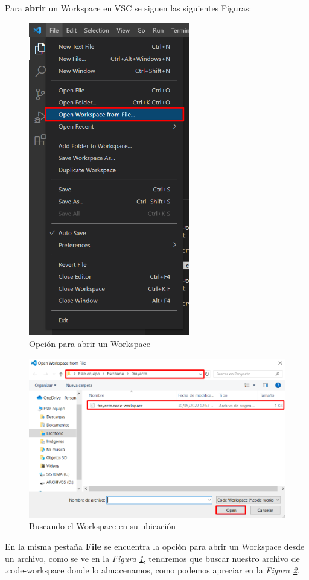 Para \textbf{abrir} un Workspace en VSC se siguen las siguientes Figuras:
\begin{figure}[H]
    \centering
    \caption{Opción para abrir un Workspace}
    \label{fig: 9}
    \includegraphics[width=7cm]{capturas/abriendo_w1.png}
\end{figure}
\begin{figure}[H]
    \centering
    \caption{Buscando el Workspace en su ubicación}
    \label{fig: 10}
    \includegraphics[width=12cm]{capturas/abriendo_w2.png}
\end{figure}

En la misma pestaña \textbf{File} se encuentra la opción para abrir un Workspace desde un archivo, como se ve en la \textit{Figura \ref{fig: 9}}, tendremos que buscar nuestro archivo de .code-workspace donde lo almacenamos, como podemos apreciar en la \textit{Figura \ref{fig: 10}}.

